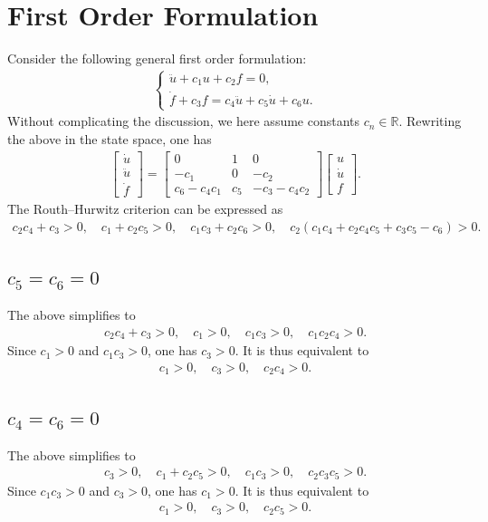 \section{First Order Formulation}
Consider the following general first order formulation:
\begin{gather}
    \left\{\begin{array}{l}
       \ddot{u}+c_1u+ c_2f=0,\\
        \dot{f}+c_3f=c_4\ddot{u}+c_5\dot{u}+c_6u.
    \end{array}\right.
\end{gather}
Without complicating the discussion, we here assume constants $c_n\in\mathbb{R}$.
Rewriting the above in the state space, one has
\begin{gather}
    \begin{bmatrix}
        \dot{u}\\
        \ddot{u}\\
        \dot{f}
    \end{bmatrix}=\begin{bmatrix}
      0  &1&0\\
       -c_1 &0&-c_2\\
    c_6-c_4c_1   &c_5&-c_3-c_4c_2
    \end{bmatrix}\begin{bmatrix}
        u\\
        \dot{u}\\
        f
    \end{bmatrix}.
\end{gather}
The Routh--Hurwitz criterion can be expressed as
\begin{gather}
    c_2c_4+c_3>0,\quad
    c_1+c_2c_5>0,\quad
    c_1c_3+c_2c_6>0,\quad
    c_2\left(c_1c_4+c_2c_4c_5+c_3c_5-c_6\right)>0.
\end{gather}
\subsection{$c_5=c_6=0$}
The above simplifies to
\begin{gather}
    c_2c_4+c_3>0,\quad
    c_1>0,\quad
    c_1c_3>0,\quad
    c_1c_2c_4>0.
\end{gather}
Since $c_1>0$ and $c_1c_3>0$, one has $c_3>0$.
It is thus equivalent to
\begin{gather}
    \boxed{c_1>0,\quad
    c_3>0,\quad
    c_2c_4>0.}
\end{gather}
\subsection{$c_4=c_6=0$}
The above simplifies to
\begin{gather}
     c_3>0,\quad
    c_1+c_2c_5>0,\quad
    c_1c_3>0,\quad
    c_2c_3c_5>0.
\end{gather}
Since $c_1c_3>0$ and $c_3>0$, one has $c_1>0$.
It is thus equivalent to
\begin{gather}
    \boxed{c_1>0,\quad
    c_3>0,\quad
    c_2c_5>0.}
\end{gather}
